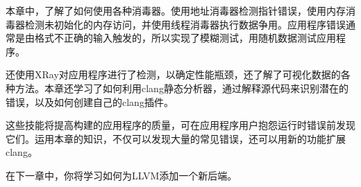 
本章中，了解了如何使用各种消毒器。使用地址消毒器检测指针错误，使用内存消毒器检测未初始化的内存访问，并使用线程消毒器执行数据争用。应用程序错误通常是由格式不正确的输入触发的，所以实现了模糊测试，用随机数据测试应用程序。

还使用XRay对应用程序进行了检测，以确定性能瓶颈，还了解了可视化数据的各种方法。本章还学习了如何利用clang静态分析器，通过解释源代码来识别潜在的错误，以及如何创建自己的clang插件。

这些技能将提高构建的应用程序的质量，可在应用程序用户抱怨运行时错误前发现它们。运用本章的知识，不仅可以发现大量的常见错误，还可以用新的功能扩展clang。

在下一章中，你将学习如何为LLVM添加一个新后端。




























